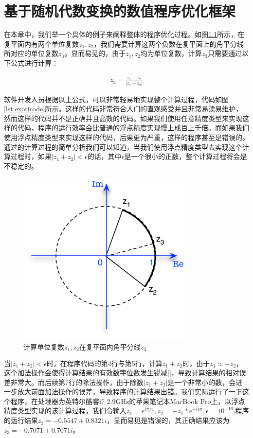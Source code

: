 \chapter{基于随机代数变换的数值程序优化框架}\label{chapter_framework}

在本章中，我们举一个具体的例子来阐释整体的程序优化过程。如图\ref{fig:midarc}所示，在复平面内有两个单位复数$z_1,z_2$，我们需要计算这两个负数在复平面上的角平分线所对应的单位复数$z_3$。显而易见的，由于$z_1,z_2$均为单位复数，计算$z_3$只需要通过以下公式进行计算：

\begin{align}\label{eq:fpex}
    z_3=\frac{z_1+z_2}{\left|z_1+z_2\right|}
\end{align}

软件开发人员根据以上公式，可以非常轻易地实现整个计算过程，代码如图\ref{lst:exoricode}所示。这样的代码非常符合人们的直观感受并且非常易读易维护，然而这样的代码并不是正确并且高效的代码。如果我们使用任意精度类型来实现这样的代码，程序的运行效率会比普通的浮点精度实现慢上成百上千倍。而如果我们使用浮点精度类型来实现这样的代码，后果更为严重，这样的程序甚至是错误的。通过的计算过程的简单分析我们可以知道，当我们使用浮点精度类型去实现这个计算过程时，如果$|z_1+z_2| < \epsilon$的话，其中$\epsilon$是一个很小的正数，整个计算过程将会是不稳定的。

\begin{figure}[thbp]
   \centering
   \includegraphics[width=88mm]{fig/ExampleArc_formal.pdf}
   \caption{计算单位复数$z_1,z_2$在复平面内角平分线$z_3$} \label{fig:midarc}
\end{figure}

当$|z_1+z_2| < \epsilon$时，在程序代码的第4行与第5行，计算$z_1+z_2$时，由于$z_1 \approx -z_2$，这个加法操作会使得计算结果的有效数字位数发生锐减[]，导致计算结果的相对误差非常大。而后续第7行的除法操作，由于除数$|z_1+z_2|$是一个非常小的数，会进一步放大前面加法操作的误差，导致程序的计算结果出错。我们实际运行了一下这个程序，在处理器为英特尔酷睿i7 2.9GHz的苹果笔记本MacBook Pro上，以浮点精度类型实现的该计算过程，我们令输入$z_1=e^{i\pi/4},z_2=-z_1*e^{-i \epsilon \pi},\epsilon=10^{-16}$,程序的运行结果$z_3=-0.5547+0.8321i$，显而易见是错误的，其正确结果应该为$z_3=-0.7071+0.7071i$。

